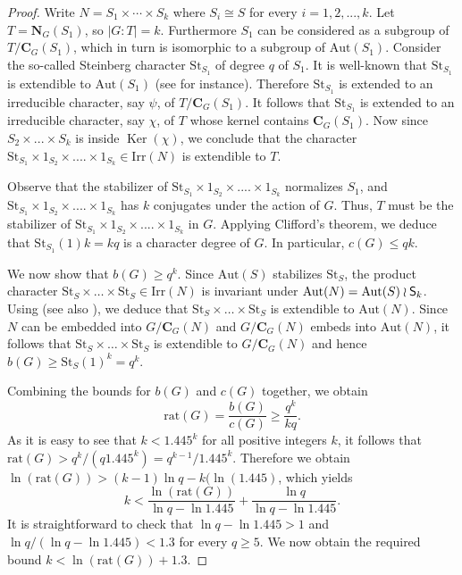 \documentclass[12pt]{amsart}
\theoremstyle{definition}
\theoremstyle{remark}
\begin{document}
\begin{proof} Write $N = S_1 \times \cdots \times S_k$ where $S_i\cong S$ for every $i=1,2,...,k$. Let $T = {\mathbf{N}}_G (S_1)$, so $|G:T| =
k$. Furthermore $S_1$ can be considered as a subgroup of
$T/{{\mathbf{C}}}_G(S_1)$, which in turn is isomorphic to a subgroup of
${{\mathrm {Aut}}}(S_1)$. Consider the so-called Steinberg character ${{\mathrm {St}}}_{S_1}$
of degree $q$ of $S_1$. It is well-known that ${{\mathrm {St}}}_{S_1}$ is
extendible to ${{\mathrm {Aut}}}(S_1)$ (see \cite{Feit} for instance). Therefore
${{\mathrm {St}}}_{S_1}$ is extended to an irreducible character, say $\psi$, of
$T/{{\mathbf{C}}}_G(S_1)$. It follows that ${{\mathrm {St}}}_{S_1}$ is extended to an
irreducible character, say $\chi$, of $T$ whose kernel contains
${{\mathbf{C}}}_G(S_1)$. Now since $S_2 \times...\times S_k$ is inside
${\operatorname{Ker}}(\chi)$, we conclude that the character ${{\mathrm {St}}}_{S_1}\times
1_{S_2}\times....\times 1_{S_k}\in{{\mathrm {Irr}}}(N)$ is extendible to $T$.

Observe that the stabilizer of ${{\mathrm {St}}}_{S_1}\times
1_{S_2}\times....\times 1_{S_k}$ normalizes $S_1$, and
${{\mathrm {St}}}_{S_1}\times 1_{S_2}\times....\times 1_{S_k}$ has $k$ conjugates
under the action of $G$. Thus, $T$ must be the stabilizer of
${{\mathrm {St}}}_{S_1}\times 1_{S_2}\times....\times 1_{S_k}$ in $G$. Applying
Clifford's theorem, we deduce that ${{\mathrm {St}}}_{S_1} (1) k=kq$ is a
character degree of $G$.  In particular, $c(G) \leq q k$.

We now show that $b(G)\geq q^k$.  Since ${{\mathrm {Aut}}} (S)$ stabilizes
${{\mathrm {St}}}_S$, the product character ${{\mathrm {St}}}_S \times\dots \times
{{\mathrm {St}}}_S\in{{\mathrm {Irr}}}(N)$ is invariant under ${{\mathrm {Aut}}}(N) = {{\mathrm {Aut}}}(S) \wr {\textup{\textsf{S}}}_k$.
Using \cite[Lemma~1.3]{Mattarei} (see also
\cite[Lemma~5]{Bianchi-Lewis}), we deduce that ${{\mathrm {St}}}_S \times \dots
\times {{\mathrm {St}}}_S$ is extendible to ${{\mathrm {Aut}}}(N)$. Since $N$ can be embedded
into $G/{{\mathbf{C}}}_G(N)$ and $G/{{\mathbf{C}}}_G(N)$ embeds into ${{\mathrm {Aut}}}(N)$, it follows
that ${{\mathrm {St}}}_S\times\dots \times {{\mathrm {St}}}_S$ is extendible to $G/{{\mathbf{C}}}_G(N)$
and hence $b(G)\geq {{\mathrm {St}}}_S(1)^k=q^k$.

Combining the bounds for $b(G)$ and $c(G)$ together, we obtain
$$
{{\mathrm {rat}}}(G)= \frac{b(G)}{c(G)}\geq \frac{q^k}{kq}.
$$
As it is easy to see that $k < 1.445^k$ for all positive integers
$k$, it follows that ${{\mathrm {rat}}} (G) > q^k/(q 1.445^k) = q^{k-1}/1.445^k.$
Therefore we obtain $\ln ({{\mathrm {rat}}} (G)) > (k-1) \ln q - k (\ln (1.445)$,
which yields
$$
k < \frac {\ln ({{\mathrm {rat}}} (G))}{\ln q - \ln 1.445} + \frac {\ln q}{\ln q
- \ln 1.445}.
$$
It is straightforward to check that $\ln q - \ln 1.445 >1$ and $\ln
q/(\ln q-\ln 1.445)<1.3$ for every $q\geq 5$. We now obtain the
required bound $k < \ln ({{\mathrm {rat}}} (G)) + 1.3$.
\end{proof}
\end{document}
